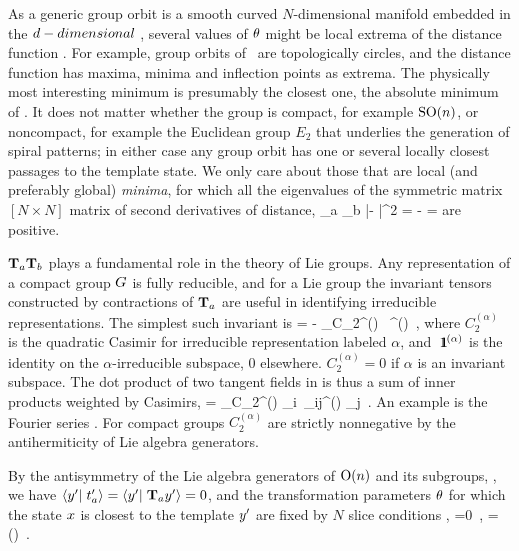 As a generic group orbit is a smooth
curved $N$-dimensional manifold embedded in
the $d-dimensional$ \statesp, several values of ${\bf \theta}$ might be local extrema of the
distance function . For example, group orbits of \
are topologically circles, and the distance function 
has maxima, minima and inflection points as extrema.
The physically most interesting minimum is
presumably the closest one, the absolute minimum of .
It does not matter whether the group is compact, for example $\textrm{SO}(n)$, or
noncompact, for example the Euclidean group $E_2$ that underlies the generation
of spiral patterns\rf{Barkley94}; in either case any group orbit has
one or several locally closest passages to the template state.
We only care about
those that are local (and preferably global) {\em minima}, for which all the eigenvalues of the
symmetric matrix $[N\!\times\!N]$ matrix of second derivatives of
distance,
\beq
{}
     {\partial \gSpace_a \partial \gSpace_b}
        |\sspRed - \slicep|^2
    =
  - =
are positive.

$\mathbf{T}_a \mathbf{T}_b$ plays a fundamental role in the theory of Lie groups.
Any representation of a compact group $G$ is fully
reducible, and for a Lie group
the invariant tensors constructed by contractions
of $\mathbf{T}_a$ are useful in identifying irreducible
representations. The simplest such invariant is
\beq
{\Lg} \cdot \Lg = - \sum_\alpha C_2^{(\alpha)} \, \id^{(\alpha)}
\,,
where $C_2^{(\alpha)}$ is the quadratic Casimir for
irreducible representation labeled $\alpha$, and
${\ \hbox{{\rm 1}\kern-.6em\hbox{\rm 1}}}^{(\alpha)}$ is the identity on the $\alpha$-irreducible
subspace, 0 elsewhere. $ C_2^{(\alpha)} =0$ if $\alpha$
is an invariant subspace.
The dot product of two tangent fields in
 is thus a sum of inner products
weighted by Casimirs,
\beq
\braket{\groupTan(\sspRed)}{\groupTan(\slicep)}
   = \sum_\alpha C_2^{(\alpha)} {\sspRed}_i\, \delta_{ij}^{(\alpha)} \slicep_j
\,.
An example is the Fourier series .
For compact groups $C_2^{(\alpha)}$ are strictly nonnegative by
the antihermiticity  of Lie algebra generators.


By the antisymmetry of the Lie algebra generators of
$\textrm{O}(n)$ and its subgroups, ,  we have
$\braket{\slicep}{\sliceTan{a}}
 = \braket{\slicep}{\Lg_{a}\slicep}=0$, and the transformation parameters
${\bf \theta}$ for which the state $x$ is closest to the template
${y'}$ are fixed by $N$ slice conditions ,
\beq
{} =0
    \,,\qquad
\sspRed = \LieEl(\gSpace) \ssp
\,.

